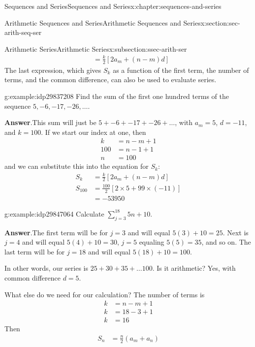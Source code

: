 \documentclass[twoside,10pt,]{book}
\newcommand{\blocktitlefont}{\relax}
\numberwithin{equation}{section}
\newcommand{\amp}{&}
\begin{document}
\begin{chapterptx}{Sequences and Series}{}{Sequences and Series}{}{}{x:chapter:sequences-and-series}
\begin{sectionptx}{Arithmetic Sequences and Series}{}{Arithmetic Sequences and Series}{}{}{x:section:sec-arith-seq-ser}
\begin{subsectionptx}{Arithmetic Series}{}{Arithmetic Series}{}{}{x:subsection:ssec-arith-ser}
\begin{align*}
\amp = \frac{k}{2}\left[ 2a_m + \left( n - m \right)d \right]
\end{align*}
The last expression, which gives \(S_k\) as a function of the first term, the number of terms, and the common difference, can also be used to evaluate series. \begin{example}{}{g:example:idp29837208}%
Find the sum of the first one hundred terms of the sequence \(5, -6, -17, -26, \ldots\).\par\smallskip%
\noindent\textbf{\blocktitlefont Answer}.\label{g:answer:idp29844120}{}\hypertarget{g:answer:idp29844120}{}\quad{}This sum will just be \(5 + -6 + -17 +  -26 + \ldots\), with \(a_m = 5\), \(d = -11\), and \(k = 100\).  If we start our index at one, then%
\begin{align*}
k \amp = n - m + 1\\
100 \amp = n - 1 + 1\\
n\amp = 100
\end{align*}
and we can substitute this into the equation for \(S_k\):%
\begin{align*}
S_k \amp = \frac{k}{2}\left[ 2a_m + \left( n - m \right)d \right]\\
S_{100} \amp = \frac{100}{2}\left[ 2 \times 5 + 99 \times \left(  - 11 \right) \right]\\
\amp =  - 53950
\end{align*}
\end{example}
 \begin{example}{}{g:example:idp29847064}%
Calculate \(\sum\limits_{j = 3}^{18} {5n + 10}\).\par\smallskip%
\noindent\textbf{\blocktitlefont Answer}.\label{g:answer:idp29846680}{}\hypertarget{g:answer:idp29846680}{}\quad{}The first term will be for \(j=3\) and will equal \(5(3)+10=25\).  Next is \(j=4\) and will equal \(5(4)+10=30\), \(j=5\) equaling \(5(5)=35\), and so on.   The last term will be for \(j=18\) and will equal \(5(18)+10=100\).%
\par
In other words, our series is \(25+30+35+\ldots 100\).  Is it arithmetic?  Yes, with common difference \(d = 5\).%
\par
What else do we need for our calculation?  The number of terms is%
\begin{align*}
k \amp = n-m+1\\
k \amp = 18-3+1\\
k\amp = 16
\end{align*}
Then%
\begin{align*}
S_n \amp = \frac{n}{2}\left(a_m + a_n \right)\\

\end{align*}
\end{example}
\end{subsectionptx}
\end{sectionptx}
\end{chapterptx}
\end{document}

